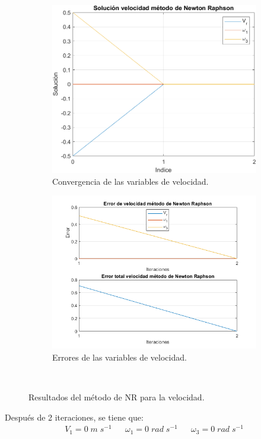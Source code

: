 \documentclass[12pt]{article}
\begin{document}
\begin{figure}[H]
\centering
  \begin{subfigure}[b]{0.49\textwidth}
    \includegraphics[width=7.5 cm, height=7.5 cm, keepaspectratio]{Implementacion/solucion vel NR.png}
    \caption{Convergencia de las variables de velocidad.}
    \label{}
  \end{subfigure}
  \hfill
  \begin{subfigure}[b]{0.49\textwidth}
    \includegraphics[width=8.5 cm, height=8.5 cm, keepaspectratio]{Implementacion/error vel NR.png}
    \caption{Errores de las variables de velocidad.}
    \label{}
  \end{subfigure}\\
  \vspace{10pt}
  \caption{Resultados del método de NR para la velocidad.}
\end{figure}
Después de 2 iteraciones, se tiene que:
\begin{align*}
V_1=0\;m\;s^{-1}&&\omega_1=0\;rad\;s^{-1}&&\omega_3=0\;rad\;s^{-1}
\end{align*}
\end{document}
